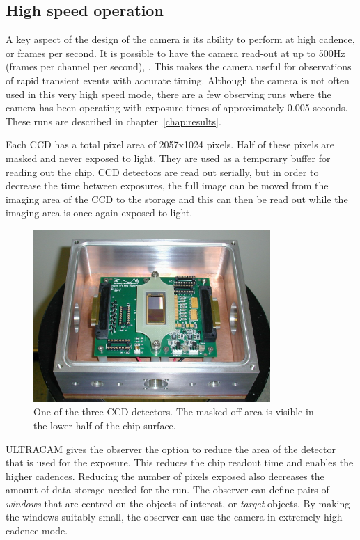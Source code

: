 \subsection{High speed operation}
A key aspect of the design of the camera is its ability to perform at high cadence, or frames per second. It is possible to have the camera read-out at up to 500Hz (frames per channel per second), \cite{dhillon07}. This makes the camera useful for observations of rapid transient events with accurate timing. Although the camera is not often used in this very high speed mode, there are a few observing runs where the camera has been operating with exposure times of approximately 0.005 seconds. These runs are described in chapter~\ref{chap:results}.

Each CCD has a total pixel area of 2057x1024 pixels. Half of these pixels are masked and never exposed to light. They are used as a temporary buffer for reading out the chip. CCD detectors are read out serially, but in order to decrease the time between exposures, the full image can be moved from the imaging area of the CCD to the storage and this can then be read out while the imaging area is once again exposed to light. 

\begin{figure}[!h]
\centering
\includegraphics[width=90mm]{images/ccd.png}
\caption{One of the three CCD detectors. The masked-off area is visible in the lower half of the chip surface.}
\label{fig2}
\end{figure}

ULTRACAM gives the observer the option to reduce the area of the detector that is used for the exposure. This reduces the chip readout time and enables the higher cadences. Reducing the number of pixels exposed also decreases the amount of data storage needed for the run. The observer can define pairs of \emph{windows} that are centred on the objects of interest, or \emph{target} objects. By making the windows suitably small, the observer can use the camera in extremely high cadence mode. 

